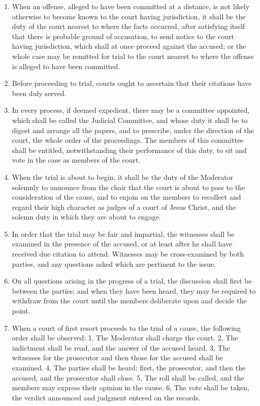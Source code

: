 \documentclass[
]{book}
\providecommand{\tightlist}{%
  \setlength{\itemsep}{0pt}\setlength{\parskip}{0pt}}
\begin{document}
\begin{enumerate}
\def\labelenumi{\arabic{enumi}.}
\setcounter{enumi}{8}
\tightlist
\item
  When an offense, alleged to have been committed at a distance, is not likely otherwise to become known to the court having jurisdiction, it shall be the duty of the court nearest to where the facts occurred, after satisfying itself that there is probable ground of accusation, to send notice to the court having jurisdiction, which shall at once proceed against the accused; or the whole case may be remitted for trial to the court nearest to where the offense is alleged to have been committed.
\item
  Before proceeding to trial, courts ought to ascertain that their citations have been duly served.
\item
  In every process, if deemed expedient, there may be a committee appointed, which shall be called the Judicial Committee, and whose duty it shall be to digest and arrange all the papers, and to prescribe, under the direction of the court, the whole order of the proceedings. The members of this committee shall be entitled, notwithstanding their performance of this duty, to sit and vote in the case as members of the court.
\item
  When the trial is about to begin, it shall be the duty of the Moderator solemnly to announce from the chair that the court is about to pass to the consideration of the cause, and to enjoin on the members to recollect and regard their high character as judges of a court of Jesus Christ, and the solemn duty in which they are about to engage.
\item
  In order that the trial may be fair and impartial, the witnesses shall be examined in the presence of the accused, or at least after he shall have received due citation to attend. Witnesses may be cross-examined by both parties, and any questions asked which are pertinent to the issue.
\item
  On all questions arising in the progress of a trial, the discussion shall first be between the parties; and when they have been heard, they may be required to withdraw from the court until the members deliberate upon and decide the point.
\item
  When a court of first resort proceeds to the trial of a cause, the following order shall be observed: 1, The Moderator shall charge the court. 2, The indictment shall be read, and the answer of the accused heard. 3, The witnesses for the prosecutor and then those for the accused shall be examined. 4, The parties shall be heard; first, the prosecutor, and then the accused, and the prosecutor shall close. 5, The roll shall be called, and the members may express their opinion in the cause. 6, The vote shall be taken, the verdict announced and judgment entered on the records.

\end{enumerate}
\end{document}
